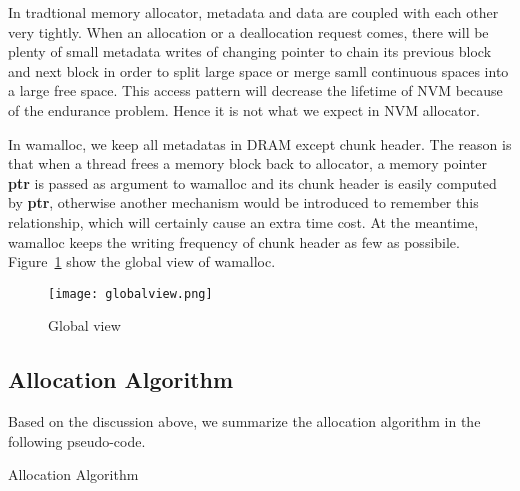 \documentclass{vldb}
\begin{document}
In tradtional memory allocator, metadata and data are coupled with each other very tightly.
When an allocation or a deallocation request comes, there will be plenty of small metadata writes of changing pointer to chain its previous block and next block in order to split large space or merge samll continuous spaces into a large free space.
This access pattern will decrease the lifetime of NVM because of the endurance problem.
Hence it is not what we expect in NVM allocator.

In wamalloc, we keep all metadatas in DRAM except chunk header. 
The reason is that when a thread frees a memory block back to allocator, a memory pointer \textbf{ptr} is passed as argument to wamalloc and its chunk header is easily computed by \textbf{ptr},
otherwise another mechanism would be introduced to remember this relationship, which will certainly cause an extra time cost.
At the meantime, wamalloc keeps the writing frequency of chunk header as few as possibile. Figure~\ref{fig:globalview} show the global view of wamalloc.

\begin{figure}[h]
\centering
\texttt{[image: globalview.png]}
\caption{Global view}
\label{fig:globalview}
\end{figure}

\subsection{Allocation Algorithm}

Based on the discussion above, we summarize the allocation algorithm in the following pseudo-code.

\begin{algorithm}
\caption{Allocation Algorithm}\label{euclid}
\end{algorithm}
\end{document}
